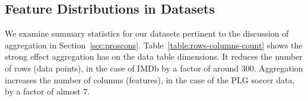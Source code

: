 \documentclass[conference]{IEEEtran}
\begin{document}
%


\subsection{Feature Distributions in Datasets}

We examine summary statistics for our datasets pertinent to the discussion of aggregation in Section~\ref{sec:proscons}. Table~\ref{table:rows-columns-count} shows the strong effect aggregation has on the data table dimensions. It reduces the number of rows (data points), in the case of IMDb by a factor of around 300. Aggregation increases the number of columns (features), in the case of the PLG soccer data, by a factor of almost 7.

\begin{table}[ht]
\caption{Data Table Dimensions}
\centering
{}
\label{table:rows-columns-count}
\end{table}
\end{document}
